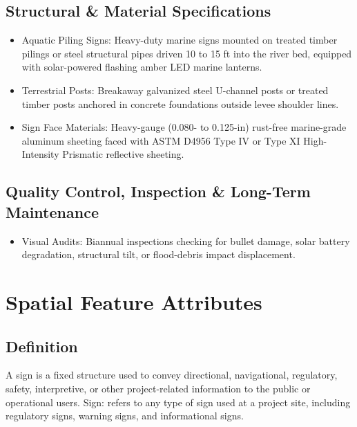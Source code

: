 \documentclass[
  letterpaper,
  DIV=11,
  numbers=noendperiod]{scrreprt}
\providecommand{\tightlist}{%
  \setlength{\itemsep}{0pt}\setlength{\parskip}{0pt}}
\begin{document}
\subsection{Structural \& Material
Specifications}\label{structural-material-specifications}

\begin{itemize}
\item
  Aquatic Piling Signs: Heavy-duty marine signs mounted on treated
  timber pilings or steel structural pipes driven 10 to 15 ft into the
  river bed, equipped with solar-powered flashing amber LED marine
  lanterns.
\item
  Terrestrial Posts: Breakaway galvanized steel U-channel posts or
  treated timber posts anchored in concrete foundations outside levee
  shoulder lines.
\item
  Sign Face Materials: Heavy-gauge (0.080- to 0.125-in) rust-free
  marine-grade aluminum sheeting faced with ASTM D4956 Type IV or Type
  XI High-Intensity Prismatic reflective sheeting.
\end{itemize}

\subsection{Quality Control, Inspection \& Long-Term
Maintenance}\label{quality-control-inspection-long-term-maintenance-23}

\begin{itemize}
\tightlist
\item
  Visual Audits: Biannual inspections checking for bullet damage, solar
  battery degradation, structural tilt, or flood-debris impact
  displacement.
\end{itemize}

\section{Spatial Feature Attributes}\label{spatial-feature-attributes-7}

\subsection{Definition}\label{definition-23}

A sign is a fixed structure used to convey directional, navigational,
regulatory, safety, interpretive, or other project-related information
to the public or operational users. Sign: refers to any type of sign
used at a project site, including regulatory signs, warning signs, and
informational signs.
\end{document}
